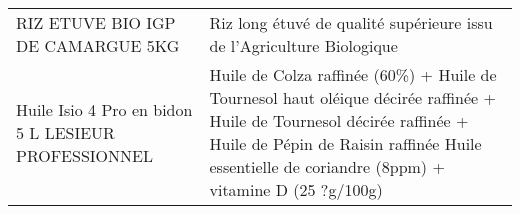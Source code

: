 \begin{longtable}{p{5cm}p{10cm}}
                                                                        RIZ ETUVE BIO IGP DE CAMARGUE 5KG &                                                                                                                                                                                                                                                                                                                                                                                                                                                                                                                                                                                                                                                                                                                                                                                                                                                                                                                                                                    Riz long étuvé de qualité supérieure issu de l'Agriculture Biologique \\
                                                      Huile Isio 4 Pro en bidon 5 L LESIEUR PROFESSIONNEL &                                                                                                                                                                                                                                                                                                                                                                                                                                                                                                                                                                                                                                                                                                                                                                                                              Huile de Colza raffinée (60\%) + Huile de Tournesol haut oléique décirée raffinée + Huile de Tournesol décirée raffinée + Huile de Pépin de Raisin raffinée  Huile essentielle de coriandre (8ppm) + vitamine D (25 ?g/100g) \\

\end{longtable}

